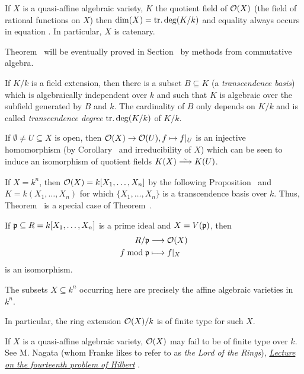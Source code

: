 \documentclass[a4paper,parskip=half,numbers=enddot, DIV=12]{scrreprt}
\begin{document}
	\begin{thm}
		If $X$ is a quasi-affine algebraic variety, $K$ the quotient field of $\mathcal{O}(X)$ (the field of rational functions on $X$) then $\dim (X) = \operatorname{tr.deg}(K/k)$ and equality always occurs in equation . In particular, $X$ is catenary.
	\end{thm}
	Theorem~ will be eventually proved in Section~ by methods from commutative algebra.
	\begin{rem*}
		\begin{alphanumerate}
			\item If $K/k$ is a field extension, then there is a subset $B\subseteq K$ (a \emph{transcendence basis}) which is algebraically independent over $k$ and such that $K$ is algebraic over the subfield generated by $B$ and $k$. The cardinality of $B$ only depends on $K/k$ and is called \emph{transcendence degree} $\operatorname{tr.deg}(K/k)$ of $K/k$. 
			\item If $\emptyset\not=U\subseteq X$ is open, then $\mathcal{O}(X)\to\mathcal{O}(U),f\mapsto f|_U$ is an injective homomorphism (by Corollary~ and irreducibility of $X$) which can be seen to induce an isomorphism of quotient fields $K(X)\isomorphism K(U)$.
			\item If $X=k^n$, then $\mathcal{O}(X)=k[X_1,\ldots,X_n]$ by the following Proposition~ and $K=k(X_1,\ldots,X_n)$ for which $\{X_1,\ldots,X_n\}$ is a transcendence basis over $k$. Thus, Theorem~ is a special case of Theorem~.
		\end{alphanumerate}		
	\end{rem*}
	\begin{prop}\lbl{prop:primeIdealIso}
		If $\mathfrak{p}\subseteq R=k[X_1,\ldots,X_n]$ is a prime ideal and $X=V(\mathfrak{p})$, then
		\begin{align*}
			R/\mathfrak{p}&\longrightarrow \mathcal{O}(X)\\
			f\bmod \mathfrak{p} &\longmapsto f|_X
		\end{align*}
		is an isomorphism.
	\end{prop}
	\begin{rem*}
		\begin{alphanumerate}
			\item The subsets $X\subseteq k^n$ occurring here are precisely the affine algebraic varieties in $k^n$.
			\item In particular, the ring extension $\mathcal{O}(X)/k$ is of finite type for such $X$.
			\item If $X$ is a quasi-affine algebraic variety, $\mathcal{O}(X)$ may fail to be of finite type over $k$. See M. Nagata (whom Franke likes to refer to as \emph{the Lord of the Rings}), \href{http://www.math.tifr.res.in/~publ/ln/tifr31.pdf}{\emph{Lecture on the fourteenth problem of Hilbert}} \cite{nagata}.
		\end{alphanumerate}
	\end{rem*}
\end{document}

